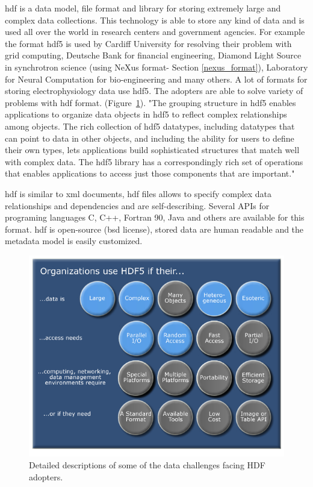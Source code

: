 \gls{hdf} is a data model, file format and library for storing extremely large and complex data collections. \cite{hdf} This technology is able to store any kind of data and is used all over the world in research centers and government agencies. For example the format \gls{hdf5} is used by Cardiff University for resolving their problem with grid computing, Deutsche Bank for financial engineering, Diamond Light Source in synchrotron science (using NeXus format- Section \ref{nexus_format}), Laboratory for Neural Computation for bio-engineering and many others. A lot of formats for storing electrophysiology data use \gls{hdf5}. The adopters are able to solve variety of problems with \gls{hdf} format. (Figure~\ref{hdf_why}). 
"The grouping structure in \gls{hdf5} enables applications to organize data objects in \gls{hdf5} to reflect complex relationships among objects. The rich collection of \gls{hdf5} datatypes, including datatypes that can point to data in other objects, and including the ability for users to define their own types, lets applications build sophisticated structures that match well with complex data. The \gls{hdf5} library has a correspondingly rich set of operations that enables applications to access just those components that are important." \cite{hdf}


\gls{hdf} is similar to \gls{xml} documents, \gls{hdf} files allows to specify complex data relationships and dependencies and are self-describing. Several APIs for programing languages C, C++, Fortran 90, Java and others are available for this format. 
\gls{hdf} is open-source (\gls{bsd} license), stored data are human readable and the metadata model is easily customized.


\begin{figure}[h]
	\begin{center}
		\includegraphics[scale=0.85]{obrazky/hdf_why.png}
		\caption{Detailed descriptions of some of the data challenges facing HDF adopters. \cite{hdf}}
		\label{hdf_why}
	\end{center}
\end{figure}

